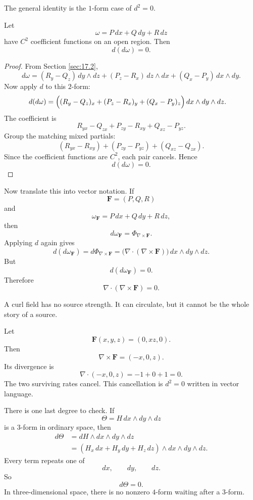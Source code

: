 The general identity is the \(1\)-form case of \(d^2=0\).

\begin{theorem}[\(d(d\omega)=0\) for \(1\)-forms]
Let
\[
    \omega=P\,dx+Q\,dy+R\,dz
\]
have \(C^2\) coefficient functions on an open region.  Then
\[
\boxed{
    d(d\omega)=0.
}
\]
\end{theorem}

\begin{proof}
From Section \ref{sec:17.2},
\[
    d\omega
    =
    (R_y-Q_z)\,dy\wedge dz
    +
    (P_z-R_x)\,dz\wedge dx
    +
    (Q_x-P_y)\,dx\wedge dy.
\]
Now apply \(d\) to this \(2\)-form:
\[
\begin{aligned}
d(d\omega)
&=
\Bigl((R_y-Q_z)_x+(P_z-R_x)_y+(Q_x-P_y)_z\Bigr)
\,dx\wedge dy\wedge dz.
\end{aligned}
\]
The coefficient is
\[
    R_{yx}-Q_{zx}+P_{zy}-R_{xy}+Q_{xz}-P_{yz}.
\]
Group the matching mixed partials:
\[
    (R_{yx}-R_{xy})
    +
    (P_{zy}-P_{yz})
    +
    (Q_{xz}-Q_{zx}).
\]
Since the coefficient functions are \(C^2\), each pair cancels.  Hence
\[
    d(d\omega)=0.
\]
\end{proof}

Now translate this into vector notation.  If
\[
    \mathbf F=(P,Q,R)
\]
and
\[
    \omega_{\mathbf F}=P\,dx+Q\,dy+R\,dz,
\]
then
\[
    d\omega_{\mathbf F}=\Phi_{\nabla\times\mathbf F}.
\]
Applying \(d\) again gives
\[
    d(d\omega_{\mathbf F})
    =
    d\Phi_{\nabla\times\mathbf F}
    =
    \bigl(\nabla\cdot(\nabla\times\mathbf F)\bigr)
    \,dx\wedge dy\wedge dz.
\]
But
\[
    d(d\omega_{\mathbf F})=0.
\]
Therefore
\[
\boxed{
    \nabla\cdot(\nabla\times\mathbf F)=0.
}
\]

A curl field has no source strength.  It can circulate, but it cannot be the whole story
of a source.

\begin{example}
Let
\[
    \mathbf F(x,y,z)=(0,xz,0).
\]
Then
\[
    \nabla\times\mathbf F=(-x,0,z).
\]
Its divergence is
\[
    \nabla\cdot(-x,0,z)
    =
    -1+0+1
    =
    0.
\]
The two surviving rates cancel.  This cancellation is \(d^2=0\) written in vector
language.
\end{example}

There is one last degree to check.  If
\[
    \Theta=H\,dx\wedge dy\wedge dz
\]
is a \(3\)-form in ordinary space, then
\[
\begin{aligned}
d\Theta
&=
dH\wedge dx\wedge dy\wedge dz\\
&=
(H_x\,dx+H_y\,dy+H_z\,dz)\wedge dx\wedge dy\wedge dz.
\end{aligned}
\]
Every term repeats one of
\[
    dx,\qquad dy,\qquad dz.
\]
So
\[
\boxed{
    d\Theta=0.
}
\]
In three-dimensional space, there is no nonzero \(4\)-form waiting after a \(3\)-form.

